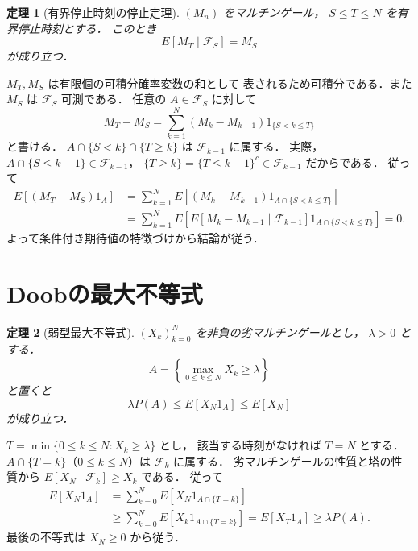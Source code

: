 \documentclass[a5paper,10pt,onecolumn]{jsarticle}
\makeatletter
\theoremstyle{mathnotetheorem}
\newtheorem{theorem}{定理}[section]
\renewcommand{\proofname}{証明}
\renewenvironment{proof}[1][\proofname]{%
  \par\pushQED{\qed}\normalfont\topsep4\p@\@plus2\p@\relax
  \trivlist\item[\hskip\labelsep\bfseries #1]\ignorespaces
}{\popQED\endtrivlist\@endpefalse}
\makeatother
\begin{document}
\begin{theorem}[有界停止時刻の停止定理]\label{thm:optional}
$(M_n)$ をマルチンゲール，
$S\le T\le N$ を有界停止時刻とする．
このとき
\[
 E[M_T\mid\mathcal F_S]=M_S
\]
が成り立つ．
\end{theorem}
\begin{proof}
$M_T,M_S$ は有限個の可積分確率変数の和として
表されるため可積分である．また $M_S$ は
$\mathcal F_S$ 可測である．
任意の $A\in\mathcal F_S$ に対して
\[
 M_T-M_S=\sum_{k=1}^N
 (M_k-M_{k-1})1_{\{S<k\le T\}}
\]
と書ける．
$A\cap\{S<k\}\cap\{T\ge k\}$ は
$\mathcal F_{k-1}$ に属する．
実際，
$A\cap\{S\le k-1\}\in\mathcal F_{k-1}$，
$\{T\ge k\}=\{T\le k-1\}^{c}\in\mathcal F_{k-1}$
だからである．
従って
\begin{align*}
 E[(M_T-M_S)1_A]
 &=\sum_{k=1}^NE[(M_k-M_{k-1})
       1_{A\cap\{S<k\le T\}}]\\
 &=\sum_{k=1}^NE[
 E[M_k-M_{k-1}\mid\mathcal F_{k-1}]
       1_{A\cap\{S<k\le T\}}]=0.
\end{align*}
よって条件付き期待値の特徴づけから結論が従う．
\end{proof}

\section{Doobの最大不等式}

\begin{theorem}[弱型最大不等式]\label{thm:doob-weak}
$(X_k)_{k=0}^N$ を非負の劣マルチンゲールとし，
$\lambda>0$ とする．
\[
 A=\left\{\max_{0\le k\le N}X_k\ge\lambda\right\}
\]
と置くと
\[
 \lambda P(A)\le E[X_N1_A]\le E[X_N]
\]
が成り立つ．
\end{theorem}
\begin{proof}
$T=\min\{0\le k\le N:X_k\ge\lambda\}$ とし，
該当する時刻がなければ $T=N$ とする．
$A\cap\{T=k\}$（$0\le k\le N$）は
$\mathcal F_k$ に属する．
劣マルチンゲールの性質と塔の性質から
$E[X_N\mid\mathcal F_k]\ge X_k$ である．
従って
\begin{align*}
 E[X_N1_A]
 &=\sum_{k=0}^NE[X_N1_{A\cap\{T=k\}}]\\
 &\ge\sum_{k=0}^NE[X_k1_{A\cap\{T=k\}}]
 =E[X_T1_A]\ge\lambda P(A).
\end{align*}
最後の不等式は $X_N\ge0$ から従う．
\end{proof}
\end{document}
